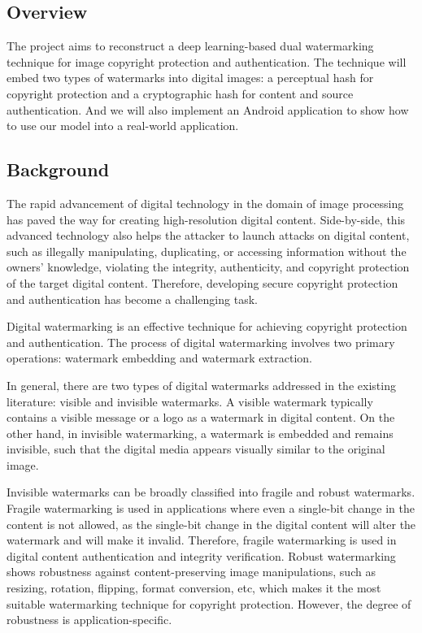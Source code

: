 \documentclass[acmsmall, nonacm]{acmart}
\begin{document}

\subsection{Overview}\label{subsec:overview}
The project aims to reconstruct a deep learning-based dual watermarking
technique for image copyright protection and authentication.
The technique will embed two types of watermarks into digital images: a
perceptual hash for copyright protection and a cryptographic hash for
content and source authentication.
And we will also implement an Android application to show how to use our model into a real-world application.

\subsection{Background}\label{subsec:background}

The rapid advancement of digital technology in the domain
of image processing has paved the way for creating
high-resolution digital content.
Side-by-side, this advanced
technology also helps the attacker to launch attacks on digital
content, such as illegally manipulating, duplicating, or accessing
information without the owners’ knowledge, violating
the integrity, authenticity, and copyright protection of the
target digital content.
Therefore, developing secure copyright protection and authentication has become a challenging task.

Digital watermarking is an effective technique for achieving
copyright protection and authentication.
The process of digital
watermarking involves two primary operations: watermark
embedding and watermark extraction.

In general, there are two types of digital watermarks addressed
in the existing literature: visible and invisible watermarks.
A visible watermark typically contains a visible
message or a logo as a watermark in digital content.
On the other hand, in invisible watermarking, a watermark is embedded
and remains invisible, such that the digital media appears
visually similar to the original image.

Invisible watermarks can be broadly classified into fragile and robust watermarks.
Fragile watermarking is used in applications where even a
single-bit change in the content is not allowed, as the single-bit change in the digital content will alter
the watermark and will make it invalid.
Therefore, fragile watermarking is used in digital content authentication and
integrity verification.
Robust watermarking shows robustness
against content-preserving image manipulations, such as resizing,
rotation, flipping, format conversion, etc, which makes it the most suitable watermarking technique
for copyright protection.
However, the degree of robustness is application-specific.
\end{document}
